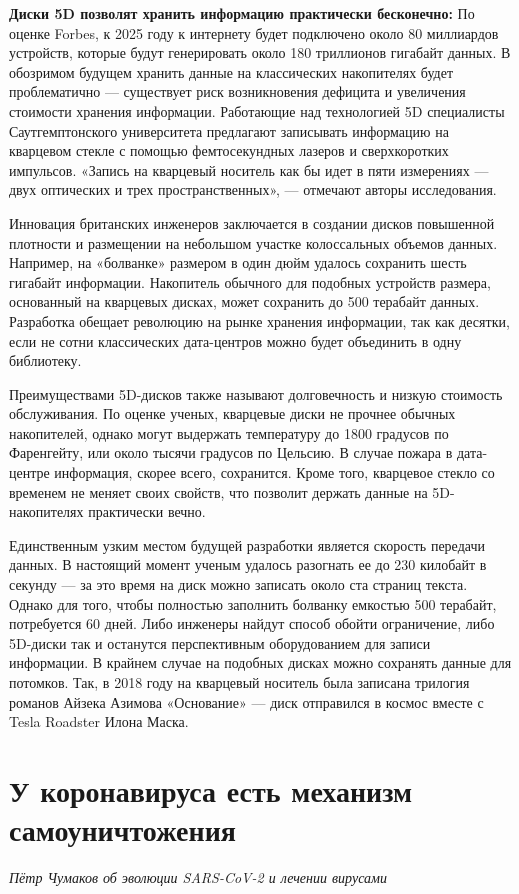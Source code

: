 \textbf{Диски 5D позволят хранить информацию практически бесконечно:}
По оценке Forbes, к 2025 году к интернету будет подключено около 80 миллиардов устройств, которые будут генерировать около 180 триллионов гигабайт данных. В обозримом будущем хранить данные на классических накопителях будет проблематично --- существует риск возникновения дефицита и увеличения стоимости хранения информации. Работающие над технологией 5D специалисты Саутгемптонского университета предлагают записывать информацию на кварцевом стекле с помощью фемтосекундных лазеров и сверхкоротких импульсов. «Запись на кварцевый носитель как бы идет в пяти измерениях --- двух оптических и трех пространственных», --- отмечают авторы исследования.

Инновация британских инженеров заключается в создании дисков повышенной плотности и размещении на небольшом участке колоссальных объемов данных. Например, на «болванке» размером в один дюйм удалось сохранить шесть гигабайт информации. Накопитель обычного для подобных устройств размера, основанный на кварцевых дисках, может сохранить до 500 терабайт данных. Разработка обещает революцию на рынке хранения информации, так как десятки, если не сотни классических дата-центров можно будет объединить в одну библиотеку.

Преимуществами 5D-дисков также называют долговечность и низкую стоимость обслуживания. По оценке ученых, кварцевые диски не прочнее обычных накопителей, однако могут выдержать температуру до 1800 градусов по Фаренгейту, или около тысячи градусов по Цельсию. В случае пожара в дата-центре информация, скорее всего, сохранится. Кроме того, кварцевое стекло со временем не меняет своих свойств, что позволит держать данные на 5D-накопителях практически вечно.

Единственным узким местом будущей разработки является скорость передачи данных. В настоящий момент ученым удалось разогнать ее до 230 килобайт в секунду --- за это время на диск можно записать около ста страниц текста. Однако для того, чтобы полностью заполнить болванку емкостью 500 терабайт, потребуется 60 дней. Либо инженеры найдут способ обойти ограничение, либо 5D-диски так и останутся перспективным оборудованием для записи информации. В крайнем случае на подобных дисках можно сохранять данные для потомков. Так, в 2018 году на кварцевый носитель была записана трилогия романов Айзека Азимова «Основание» --- диск отправился в космос вместе с Tesla Roadster Илона Маска.



\section{У коронавируса есть механизм самоуничтожения}
\textit{Пётр Чумаков об эволюции SARS-CoV-2 и лечении вирусами}


